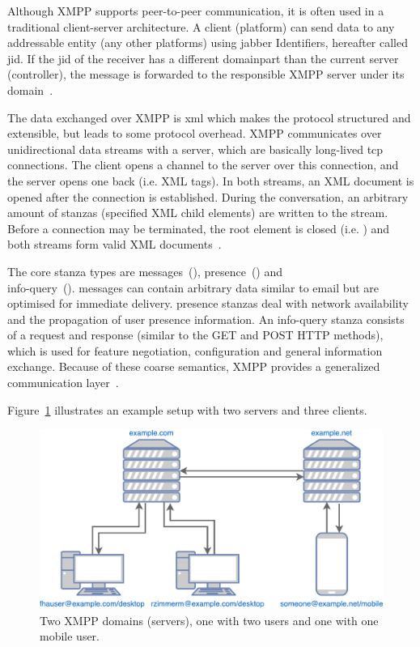 Although XMPP supports peer-to-peer communication, it is often used in a traditional client-server architecture.
A client (\gls{platform}) can send data to any addressable entity (any other \glspl{platform}) using \Gls{jabber} Identifiers, hereafter called \gls{jid}. If the \gls{jid} of the receiver has a different domainpart than the current server (\gls{controller}), the message is forwarded to the responsible XMPP server under its domain~\cite{rfc6120}.

The data exchanged over XMPP is \gls{xml} which makes the protocol structured and extensible, but leads to some protocol overhead.
XMPP communicates over unidirectional data streams with a server, which are basically long-lived \gls{tcp} connections.
The client opens a channel to the server over this connection, and the server opens one back (i.e.  XML tags). In both streams, an XML document is opened after the connection is established.
During the conversation, an arbitrary amount of \glspl{stanza} (specified XML child elements) are written to the stream.
Before a connection may be terminated, the root element is closed (i.e. ) and both streams form valid XML documents~\cite{rfc6120}\cite{professional-xmpp}.

The core \gls{stanza} types are \glspl{message}~(), \gls{presence}~() and\\
\gls{info-query}~().
\Glspl{message} can contain arbitrary data similar to email but are optimised for immediate delivery.
\Gls{presence} \glspl{stanza} deal with network availability and the propagation of user presence information.
An \gls{info-query} \gls{stanza} consists of a request and response (similar to the GET and POST HTTP methods), which is used for feature negotiation, configuration and general information exchange.
Because of these coarse semantics, XMPP provides a generalized communication layer~\cite{rfc6120}\cite{ieee-xplore-stream-xml-xmpp}.

Figure~\ref{fig:xmpp-overview} illustrates an example setup with two servers and three clients.

\begin{figure}[h]
	\centering
	\includegraphics[width=0.8\linewidth]{resources/xmpp_overview.pdf}
	\caption{Two XMPP domains (servers), one with two users and one with one mobile user.}
	\label{fig:xmpp-overview}
\end{figure}

